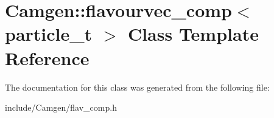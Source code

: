 \hypertarget{a00234}{}\section{Camgen\+:\+:flavourvec\+\_\+comp$<$ particle\+\_\+t $>$ Class Template Reference}
\label{a00234}


The documentation for this class was generated from the following file\+:\begin{DoxyCompactItemize}
\item 
include/\+Camgen/flav\+\_\+comp.\+h\end{DoxyCompactItemize}
